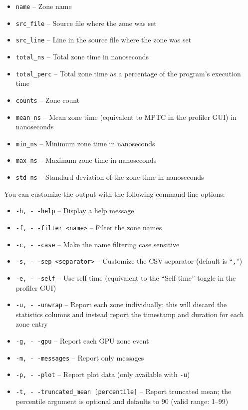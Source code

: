 \documentclass[hidelinks,titlepage,a4paper,twoside]{article}
\begin{document}
\begin{itemize}
  \item \texttt{name} -- Zone name
  \item \texttt{src\_file} -- Source file where the zone was set
  \item \texttt{src\_line} -- Line in the source file where the zone was set
  \item \texttt{total\_ns} -- Total zone time in nanoseconds
  \item \texttt{total\_perc} -- Total zone time as a percentage of the program's execution time
  \item \texttt{counts} -- Zone count
  \item \texttt{mean\_ns} -- Mean zone time (equivalent to MPTC in the profiler GUI) in nanoseconds
  \item \texttt{min\_ns} -- Minimum zone time in nanoseconds
  \item \texttt{max\_ns} -- Maximum zone time in nanoseconds
  \item \texttt{std\_ns} -- Standard deviation of the zone time in nanoseconds
\end{itemize}

You can customize the output with the following command line options:

\begin{itemize}
  \item \texttt{-h, -\hspace{-1.25ex} -help} -- Display a help message
  \item \texttt{-f, -\hspace{-1.25ex} -filter <name>} -- Filter the zone names
  \item \texttt{-c, -\hspace{-1.25ex} -case} -- Make the name filtering case sensitive
  \item \texttt{-s, -\hspace{-1.25ex} -sep <separator>} -- Customize the CSV separator (default is \enquote{\texttt{,}})
  \item \texttt{-e, -\hspace{-1.25ex} -self} -- Use self time (equivalent to the \enquote{Self time} toggle in the profiler GUI)
  \item \texttt{-u, -\hspace{-1.25ex} -unwrap} -- Report each zone individually; this will discard the statistics columns and instead report the timestamp and duration for each zone entry
  \item \texttt{-g, -\hspace{-1.25ex} -gpu} -- Report each GPU zone event
  \item \texttt{-m, -\hspace{-1.25ex} -messages} -- Report only messages
  \item \texttt{-p, -\hspace{-1.25ex} -plot} -- Report plot data (only available with \texttt{-u})
  \item \texttt{-t, -\hspace{-1.25ex} -truncated\_mean [percentile]} -- Report truncated mean; the percentile argument is optional and defaults to 90 (valid range: 1--99)
\end{itemize}
\end{document}
